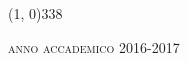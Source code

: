 \begin{titlepage}
\begin{center}
\begin{large}
\begin{flushright}
\vspace{5pt}
\myName
\end{flushright}
\end{large}

\vspace{40pt}

\line(1, 0){338}											%
\begin{normalsize}

\textsc{anno accademico 2016-2017}
\end{normalsize}

\end{center}
\end{titlepage}
